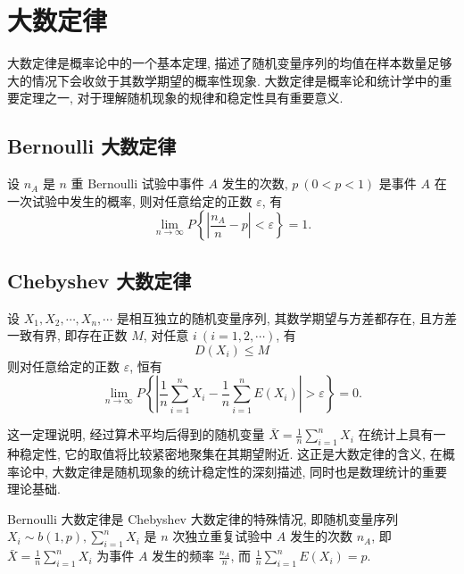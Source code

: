 \section{大数定律}

大数定律是概率论中的一个基本定理, 描述了随机变量序列的均值在样本数量足够大的情况下会收敛于其数学期望的概率性现象. 大数定律是概率论和统计学中的重要定理之一, 对于理解随机现象的规律和稳定性具有重要意义.

\subsection{Bernoulli 大数定律}

\begin{theorem}
    设 $ n_{A} $ 是 $ n $ 重 Bernoulli 试验中事件 $ A $ 发生的次数, $ p~(0<p<1)$ 是事件 $ A $ 在一次试验中发生的概率, 则对任意给定的正数 $ \varepsilon $, 有
    $$\lim _{n \rightarrow \infty} P\left\{\left|\frac{n_{A}}{n}-p\right|<\varepsilon\right\}=1 .$$
\end{theorem}

\subsection{Chebyshev 大数定律}

\begin{theorem}
    设 $ X_{1}, X_{2}, \cdots, X_{n}, \cdots $ 是相互独立的随机变量序列, 其数学期望与方差都存在, 且方差一致有界, 即存在正数 $ M $, 对任意 $ i~(i=1,2, \cdots) $, 有
    $$D\left(X_{i}\right) \leqslant M$$
    则对任意给定的正数 $ \varepsilon $, 恒有
    $$\lim _{n \rightarrow \infty} P\left\{\left|\frac{1}{n} \sum_{i=1}^{n} X_{i}-\frac{1}{n} \sum_{i=1}^{n} E\left(X_{i}\right)\right|>\varepsilon\right\}=0 .$$
\end{theorem}

这一定理说明, 经过算术平均后得到的随机变量 $\displaystyle \bar{X}=\frac{1}{n} \sum_{i=1}^{n} X_{i} $ 在统计上具有一种稳定性, 它的取值将比较紧密地聚集在其期望附近. 这正是大数定律的含义, 在概率论中, 大数定律是随机现象的统计稳定性的深刻描述, 同时也是数理统计的重要理论基础.

Bernoulli 大数定律是 Chebyshev 大数定律的特殊情况, 即随机变量序列 $\displaystyle X_{i} \sim b(1, p) ,  \sum_{i=1}^{n} X_{i} $ 是 $ n $ 次独立重复试验中 $ A $ 发生的次数 $ n_{A} $, 即 $\displaystyle \bar{X}=\frac{1}{n} \sum_{i=1}^{n} X_{i} $ 为事件 $ A $ 发生的频率 $\displaystyle \frac{n_{A}}{n} $, 而 $\displaystyle \frac{1}{n} \sum_{i=1}^{n} E\left(X_{i}\right)=p $.

